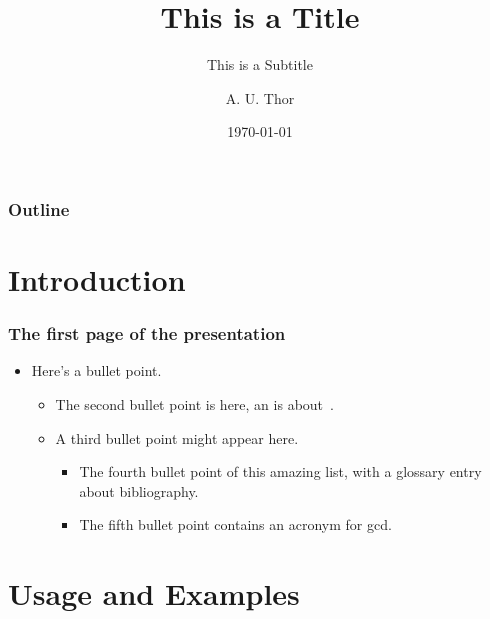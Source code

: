 \documentclass[american,aspectratio=169]{beamer}
\title{This is a Title}
\subtitle[Short Subtitle]{This is a Subtitle}
\author{A. U. Thor}
\institute[USN]{\USN \\ \FacultyTNM \\ \DepartmentSIS}
\date{\today}
\begin{document}
\usntitlepage

\section[Outline]{}


\begin{frame}
	\frametitle{Outline}
	\tableofcontents
\end{frame}

\section{Introduction}

\begin{frame}
	\frametitle{The first page of the presentation}
	\begin{itemize}
		\item Here's a bullet point.
			\begin{itemize}
				\item The second bullet point is here, an is
					about~\textcite{claerbout1991scrutiny}.
				\item A third bullet point might appear here.
					\begin{itemize}
						\item The fourth bullet point of this amazing list, with
							a glossary entry about \gls{bibliography}.
						\item The fifth bullet point contains an acronym for \gls{gcd}.
					\end{itemize}
			\end{itemize}
	\end{itemize}
\end{frame}

\section{Usage and Examples}
\end{document}

